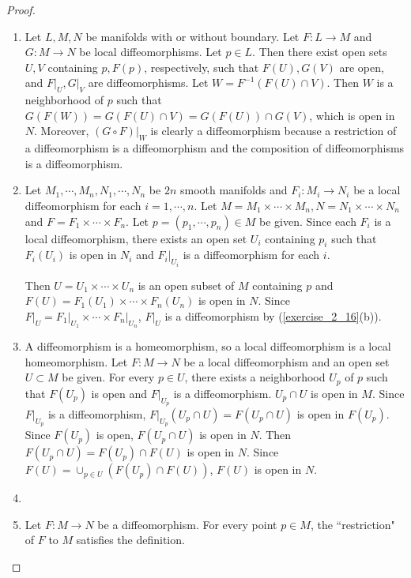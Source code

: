 \begin{proof}
  $ $
  \begin{enumerate}[label=(\alph*)]
    \item 
      Let $L, M, N$ be manifolds with or without boundary.
      Let $F: L \rightarrow M$ and $G: M \rightarrow N$ be local diffeomorphisms.
      Let $p \in L$.
      Then there exist open sets $U, V$ containing $p, F(p)$, respectively, such that $F(U), G(V)$ are open, and $F\vert_U, G\vert_V$ are diffeomorphisms.
      Let $W = F^{-1}(F(U) \cap V)$.
      Then $W$ is a neighborhood of $p$ such that $G(F(W)) = G(F(U) \cap V) = G(F(U)) \cap G(V)$, which is open in $N$.
      Moreover, $(G \circ F)\vert_{W}$ is clearly a diffeomorphism because a restriction of a diffeomorphism is a diffeomorphism and the composition of diffeomorphisms is a diffeomorphism.
    \item
      Let $M_1, \cdots, M_n, N_1, \cdots, N_n$ be $2n$ smooth manifolds and $F_i: M_i \rightarrow N_i$ be a local diffeomorphism for each $i = 1, \cdots, n$.
      Let $M = M_1 \times \cdots \times M_n, N = N_1 \times \cdots \times N_n$ and $F = F_1 \times \cdots \times F_n$.
      Let $p = (p_1, \cdots, p_n) \in M$ be given.
      Since each $F_i$ is a local diffeomorphism, there exists an open set $U_i$ containing $p_i$ such that $F_i(U_i)$ is open in $N_i$ and $F_i\vert_{U_i}$ is a diffeomorphism for each $i$.

      Then $U = U_1 \times \cdots \times U_n$ is an open subset of $M$ containing $p$ and $F(U) = F_1(U_1) \times \cdots \times F_n(U_n)$ is open in $N$.
      Since $F\vert_U = F_1\vert_{U_1} \times \cdots \times F_n\vert_{U_n}$, $F\vert_U$ is a diffeomorphism by (\ref{exercise_2_16}(b)).
    \item
      A diffeomorphism is a homeomorphism, so a local diffeomorphism is a local homeomorphism.
      Let $F: M \rightarrow N$ be a local diffeomorphism and an open set $U \subset M$ be given.
      For every $p \in U$, there exists a neighborhood $U_p$ of $p$ such that $F(U_p)$ is open and $F\vert_{U_p}$ is a diffeomorphism.
      $U_p \cap U$ is open in $M$.
      Since $F\vert_{U_p}$ is a diffeomorphism, $F\vert_{U_p}(U_p \cap U) = F(U_p \cap U)$ is open in $F(U_p)$.
      Since $F(U_p)$ is open, $F(U_p \cap U)$ is open in $N$.
      Then $F(U_p \cap U) = F(U_p) \cap F(U)$ is open in $N$.
      Since $F(U) = \cup_{p \in U} (F(U_p) \cap F(U))$, $F(U)$ is open in $N$.
    \item
    \item
      Let $F:M \rightarrow N$ be a diffeomorphism.
      For every point $p \in M$, the ``restriction" of $F$ to $M$ satisfies the definition.
  \end{enumerate}
\end{proof}
